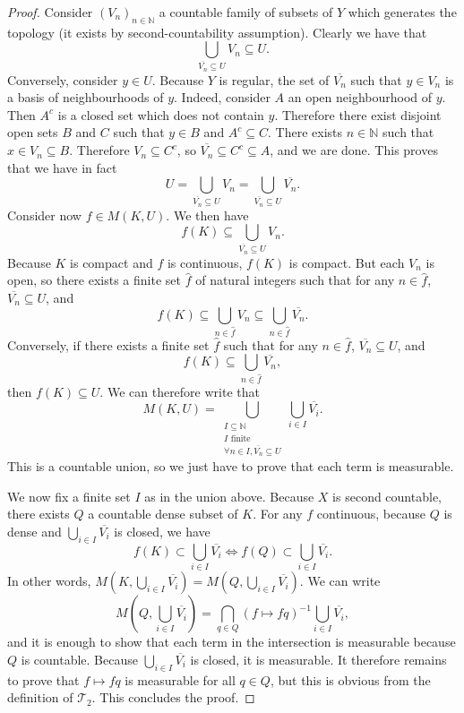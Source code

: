 \begin{proof}
Consider $(V_n)_{n \in \mathbb{N}}$ a countable family of subsets of $Y$ which generates the topology (it exists by second-countability assumption). Clearly we have that
$$\bigcup_{\overline{V_n} \subseteq U} V_n \subseteq U.$$
Conversely, consider $y \in U$. Because $Y$ is regular, the set of $\overline{V_n}$ such that $y \in V_n$ is a basis of neighbourhoods of $y$. Indeed, consider $A$ an open neighbourhood of $y$. Then $A^c$ is a closed set which does not contain $y$. Therefore there exist disjoint open sets $B$ and $C$ such that $y \in B$ and $A^c \subseteq C$. There exists $n \in \mathbb{N}$ such that $x \in V_n \subseteq B$. Therefore $V_n \subseteq C^c$, so $\overline{V_n} \subseteq C^c \subseteq A$, and we are done. This proves that we have in fact
$$U = \bigcup_{\overline{V_n} \subseteq U} V_n = \bigcup_{\overline{V_n} \subseteq U} \overline{V_n}.$$
Consider now $f \in M(K, U)$. We then have
$$f(K) \subseteq \bigcup_{\overline{V_n} \subseteq U} V_n.$$
Because $K$ is compact and $f$ is continuous, $f(K)$ is compact. But each $V_n$ is open, so there exists a finite set $\hat{f}$ of natural integers such that for any $n \in \hat{f}$, $\overline{V_n} \subseteq U$, and
$$f(K) \subseteq \bigcup_{n \in \hat{f}} V_n \subseteq \bigcup_{n \in \hat{f}} \overline{V_n}.$$
Conversely, if there exists a finite set $\hat{f}$ such that for any $n \in \hat{f}$, $\overline{V_n} \subseteq U$, and
$$f(K) \subseteq \bigcup_{n \in \hat{f}} \overline{V_n},$$
then $f(K) \subseteq U$. We can therefore write that
$$M(K, U) = \bigcup_{\substack{I \subseteq \mathbb{N} \\ I \text{ finite} \\ \forall n \in I, \overline{V_n} \subseteq U}} \bigcup_{i \in I} \overline{V_i}.$$
This is a countable union, so we just have to prove that each term is measurable.

We now fix a finite set $I$ as in the union above. Because $X$ is second countable, there exists $Q$ a countable dense subset of $K$. For any $f$ continuous, because $Q$ is dense and $\bigcup_{i \in I} \overline{V_i}$ is closed, we have
$$f(K) \subset \bigcup_{i \in I} \overline{V_i} \Longleftrightarrow f(Q) \subset \bigcup_{i \in I} \overline{V_i}.$$
In other words, $M\left(K, \bigcup_{i \in I} \overline{V_i}\right) = M\left(Q, \bigcup_{i \in I} \overline{V_i}\right)$. We can write
$$M\left(Q, \bigcup_{i \in I} \overline{V_i}\right) = \bigcap_{q \in Q} (f \mapsto f q)^{-1} \bigcup_{i \in I} \overline{V_i},$$
and it is enough to show that each term in the intersection is measurable because $Q$ is countable. Because $\bigcup_{i \in I} \overline{V_i}$ is closed, it is measurable. It therefore remains to prove that $f \mapsto f q$ is measurable for all $q \in Q$, but this is obvious from the definition of $\mathcal{T}_2$. This concludes the proof.
\end{proof}


